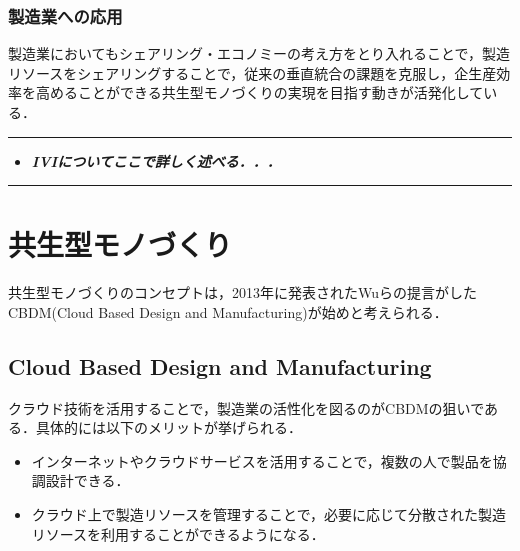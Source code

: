 \hypertarget{ux88fdux9020ux696dux3078ux306eux5fdcux7528}{%
\subsubsection{製造業への応用}\label{ux88fdux9020ux696dux3078ux306eux5fdcux7528}}

製造業においてもシェアリング・エコノミーの考え方をとり入れることで，製造リソースをシェアリングすることで，従来の垂直統合の課題を克服し，企生産効率を高めることができる共生型モノづくりの実現を目指す動きが活発化している\cite{IVI}\cite{Hitachi-csmfg}．

\begin{center}\rule{0.5\linewidth}{0.5pt}\end{center}

\begin{itemize}
\tightlist
\item
  \textbf{\emph{IVIについてここで詳しく述べる．．．}}
\end{itemize}

\begin{center}\rule{0.5\linewidth}{0.5pt}\end{center}

\hypertarget{ux5171ux751fux578bux30e2ux30ceux3065ux304fux308a}{%
\section{共生型モノづくり}\label{ux5171ux751fux578bux30e2ux30ceux3065ux304fux308a}}

共生型モノづくりのコンセプトは，2013年に発表されたWuらの提言がしたCBDM(Cloud
Based Design and Manufacturing)が始めと考えられる\cite{WU2013}．

\hypertarget{cloud-based-design-and-manufacturing}{%
\subsection{Cloud Based Design and
Manufacturing}\label{cloud-based-design-and-manufacturing}}

クラウド技術を活用することで，製造業の活性化を図るのがCBDMの狙いである．具体的には以下のメリットが挙げられる．

\begin{itemize}
\tightlist
\item
  インターネットやクラウドサービスを活用することで，複数の人で製品を協調設計できる．
\item
  クラウド上で製造リソースを管理することで，必要に応じて分散された製造リソースを利用することができるようになる．
\end{itemize}

